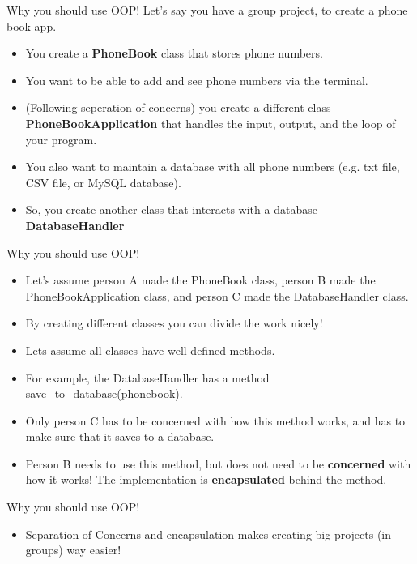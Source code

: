 \begin{frame}{Why you should use OOP!}
Let's say you have a group project, to create a phone book app.
\begin{itemize}
    \pause
    \item You create a \textbf{PhoneBook} class that stores phone numbers.
    \pause
    \item You want to be able to add and see phone numbers via the terminal.
    \pause
    \item (Following seperation of concerns) you create a different class \textbf{PhoneBookApplication} that handles the input, output, and the loop of your program.
    \pause
    \item You also want to maintain a database with all phone numbers (e.g. txt file, CSV file, or MySQL database).
    \pause
    \item So, you create another class that interacts with a database \textbf{DatabaseHandler}
\end{itemize}
\end{frame}

\begin{frame}{Why you should use OOP!}
\begin{itemize}
    \item Let's assume person A made the PhoneBook class, person B made the PhoneBookApplication class, and person C made the DatabaseHandler class.
    \pause
    \item By creating different classes you can divide the work nicely!
    \pause
    \item Lets assume all classes have well defined methods.
    \pause
    \item For example, the DatabaseHandler has a method save\_to\_database(phonebook).
    \pause
    \item Only person C has to be concerned with how this method works, and has to make sure that it saves to a database.
    \pause
    \item Person B needs to use this method, but does not need to be \textbf{concerned} with how it works! The implementation is \textbf{encapsulated} behind the method.
\end{itemize}
\end{frame}

\begin{frame}{Why you should use OOP!}
    \begin{itemize}
        \item Separation of Concerns and encapsulation makes creating big projects (in groups) way easier!
    \end{itemize}
\end{frame}